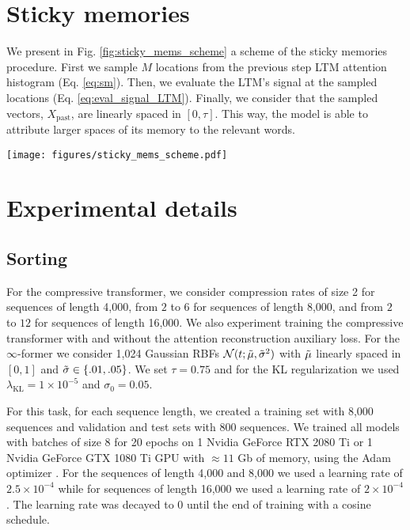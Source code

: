 \documentclass[11pt]{article}
\begin{document}
\section{Sticky memories}
We present in Fig. \ref{fig:sticky_mems_scheme} a scheme of the sticky memories procedure.
First we sample $M$ locations from the previous step LTM attention histogram (Eq. \ref{eq:sm}). Then, we evaluate the LTM's signal at the sampled locations (Eq. \ref{eq:eval_signal_LTM}). Finally, we consider that the sampled vectors, $X_\mathrm{past}$, are linearly spaced in $[0,\tau]$. This way, the model is able to attribute larger spaces of its memory to the relevant words.
\label{app:sticky_mems}
\begin{figure*}[t]
  \centering
    \texttt{[image: figures/sticky\_mems\_scheme.pdf]}
  \caption{Sticky memories procedure diagram. The dashed vertical lines correspond to the position of the words in the LTM signal.}
  \label{fig:sticky_mems_scheme}
\end{figure*}


\section{Experimental details}
\subsection{Sorting}
\label{app:sorting}
For the compressive transformer, we consider compression rates of size 2 for sequences of length 4,000, from $2$ to $6$ for sequences of length 8,000, and from $2$ to $12$ for sequences of length 16,000. We also experiment training the compressive transformer with and without the attention reconstruction auxiliary loss. For the $\infty$-former we consider 1,024 Gaussian RBFs $\mathcal{N} (t;\Tilde{\mu},\Tilde{\sigma}^2)$ with $\Tilde{\mu}$ linearly spaced in $[0,1]$ and $\Tilde{\sigma} \in \{.01,.05\}$. We set $\tau=0.75$ and for the KL regularization we used $\lambda_{\mathrm{KL}} = 1 \times 10^{-5}$ and $\sigma_0 = 0.05$.

For this task, for each sequence length, we created a training set with 8,000 sequences and validation and test sets with 800 sequences. We trained all models with batches of size 8 for 20 epochs on 1 Nvidia GeForce RTX 2080 Ti or 1 Nvidia GeForce GTX 1080 Ti GPU with $\approx 11$ Gb of memory, using the Adam optimizer \citep{kingma2015adam}. For the sequences of length 4,000 and 8,000 we used a learning rate of $2.5 \times 10^{-4}$ while for sequences of length 16,000 we used a learning rate of $2 \times 10^{-4}$. The learning rate was decayed to 0 until the end of training with a cosine schedule.
\end{document}
